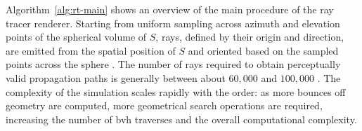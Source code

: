 Algorithm~\ref{alg:rt-main} shows an overview of the main procedure of the ray tracer renderer. Starting from uniform sampling across azimuth and elevation points of the spherical volume of $S$, rays, defined by their origin and direction, are emitted from the spatial position of $S$ and oriented based on the sampled points across the sphere \citep{shirley2008realistic}.
The number of rays required to obtain perceptually valid propagation paths is generally between about $60,000$ and $100,000$ \citep{le2000comparison, pompei2009computer, pelzer2010frequency}. The complexity of the simulation scales rapidly with the order: as more bounces off geometry are computed, more geometrical search operations are required, increasing the number of \acrshort{bvh} traverses and the overall computational complexity.\par

